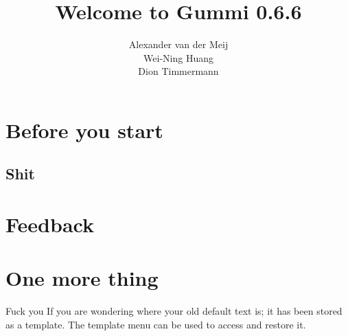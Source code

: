 \documentclass[11pt]{article}
\title{\textbf{Welcome to Gummi 0.6.6}}
\author{Alexander van der Meij\\
		Wei-Ning Huang\\
		Dion Timmermann}
\date{}
\begin{document}
\maketitle

\section{Before you start}
	

\subsection{Shit}
	
\section{Feedback}
	

\section{One more thing}
Fuck you
If you are wondering where your old default text is; it has been stored as a template. The template menu can be used to access and restore it. 
\end{document}
